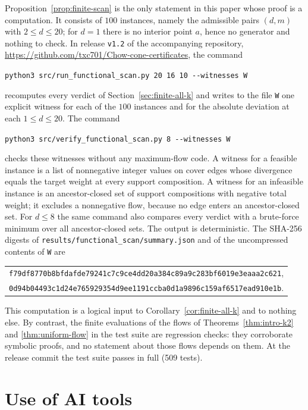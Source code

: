 \documentclass[11pt]{amsart}
\theoremstyle{definition}
\theoremstyle{remark}
\begin{document}
Proposition~\ref{prop:finite-scan} is the only statement in this paper whose
proof is a computation.  It consists of $100$ instances, namely the
admissible pairs $(d,m)$ with $2\le d\le20$; for $d=1$ there is no interior
point $a$, hence no generator and nothing to check.  In release
\texttt{v1.2} of the accompanying repository,
\url{https://github.com/txc701/Chow-cone-certificates}, the command
\begin{center}
\texttt{python3 src/run\_functional\_scan.py 20 16 10 -{}-witnesses W}
\end{center}
recomputes every verdict of Section~\ref{sec:finite-all-k} and writes to the
file \texttt{W} one explicit witness for each of the $100$ instances and for
the absolute deviation at each $1\le d\le20$.  The command
\begin{center}
\texttt{python3 src/verify\_functional\_scan.py 8 -{}-witnesses W}
\end{center}
checks these witnesses without any maximum-flow code.  A witness for a
feasible instance is a list of nonnegative integer values on cover edges
whose divergence equals the target weight at every support composition.  A
witness for an infeasible instance is an ancestor-closed set of support
compositions with negative total weight; it excludes a nonnegative flow,
because no edge enters an ancestor-closed set.  For $d\le8$ the same command
also compares every verdict with a brute-force minimum over all
ancestor-closed sets.  The output is deterministic.  The SHA-256 digests of
\texttt{results/functional\_scan/summary.json} and of the uncompressed
contents of \texttt{W} are
\begin{center}\small
\begin{tabular}{@{}l@{}}
\texttt{f79df8770b8bfdafde79241c7c9ce4dd20a384c89a9c283bf6019e3eaaa2c621},\\
\texttt{0d94b04493c1d24e765929354d9ee1191ccba0d1a9896c159af6517ead910e1b}.
\end{tabular}
\end{center}

This computation is a logical input to
Corollary~\ref{cor:finite-all-k} and to nothing else.  By contrast, the
finite evaluations of the flows of Theorems~\ref{thm:intro-k2} and
\ref{thm:uniform-flow} in the test suite are regression checks: they
corroborate symbolic proofs, and no statement about those flows depends on
them.  At the release commit the test suite passes in full
(509 tests).

\section*{Use of AI tools}
\end{document}

